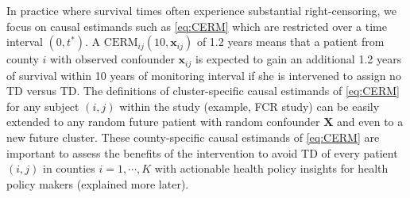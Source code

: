 \documentclass[aoas]{imsart}
\theoremstyle{plain}
\theoremstyle{definition}
\begin{document}
In practice where survival times often experience substantial right-censoring, we focus on causal estimands such as \eqref{eq:CERM} which are restricted over a time interval $(0,t^*)$. 
 A ${\text{CERM}_{ij}}(10, \mathbf{x}_{ij})$ of 1.2 years means that a patient from county $i$ with observed confounder $\mathbf{x}_{ij}$ 
 is expected to gain an additional 1.2 years of survival within 10 years of monitoring interval if she is intervened to assign no TD versus TD.
The definitions of cluster-specific causal estimands of \eqref{eq:CERM} for any subject $(i,j)$ within the study (example, FCR study) can be easily extended to any random future patient with random confounder $\mathbf{X}$ and even to a new future cluster. 
These county-specific causal estimands of \eqref{eq:CERM} are important to assess the benefits of the intervention to avoid TD of every patient $(i,j)$ in counties $i=1,\cdots, K$ with actionable health policy insights for health policy makers (explained more later). 





\end{document}
